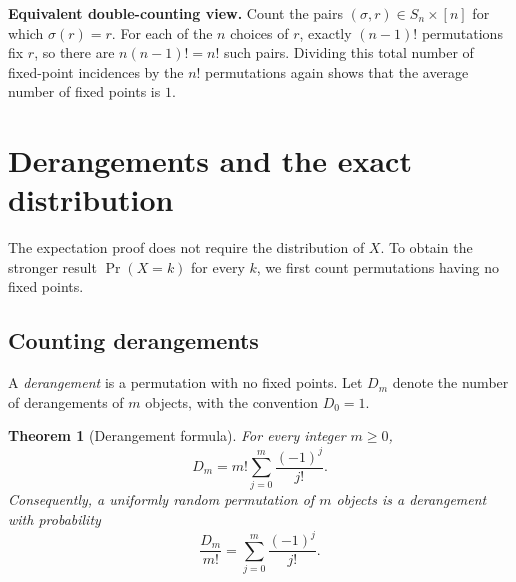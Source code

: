 \documentclass[11pt,a4paper]{article}
\newtheorem{theorem}{Theorem}
\begin{document}
\textbf{Equivalent double-counting view.}
Count the pairs \((\sigma,r)\in S_n\times[n]\) for which
\(\sigma(r)=r\). For each of the \(n\) choices of \(r\), exactly
\((n-1)!\) permutations fix \(r\), so there are
\(n(n-1)!=n!\) such pairs. Dividing this total number of fixed-point
incidences by the \(n!\) permutations again shows that the average number of
fixed points is \(1\).

\section{Derangements and the exact distribution}

The expectation proof does not require the distribution of \(X\). To obtain
the stronger result \(\Pr(X=k)\) for every \(k\), we first count
permutations having no fixed points.

\subsection{Counting derangements}

A \emph{derangement} is a permutation with no fixed points. Let \(D_m\)
denote the number of derangements of \(m\) objects, with the convention
\(D_0=1\).

\begin{theorem}[Derangement formula]
For every integer \(m\geq 0\),
\[
  D_m=m!\sum_{j=0}^{m}\frac{(-1)^j}{j!}.
\]
Consequently, a uniformly random permutation of \(m\) objects is a
derangement with probability
\[
  \frac{D_m}{m!}=\sum_{j=0}^{m}\frac{(-1)^j}{j!}.
\]
\end{theorem}
\end{document}
